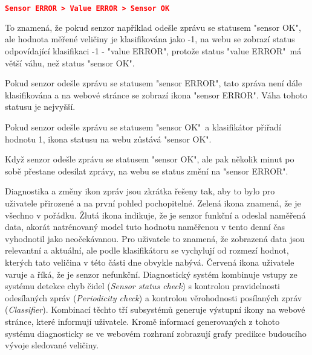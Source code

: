 \begin{lstlisting}[language=json]
	   Sensor ERROR > Value ERROR > Sensor OK
\end{lstlisting}

To znamená, že pokud senzor například odešle zprávu se statusem "sensor OK", ale hodnota měřené veličiny je klasifikována jako -1, na webu se zobrazí status odpovídající klasifikaci -1 - "value ERROR", protože status "value ERROR"\ má větší váhu, než status "sensor OK". \par
Pokud senzor odešle zprávu se statusem "sensor ERROR", tato zpráva není dále klasifikována a na webové stránce se zobrazí ikona "sensor ERROR". Váha tohoto statusu je nejvyšší. \par
Pokud senzor odešle zprávu se statusem "sensor OK"\ a klasifikátor přiřadí hodnotu 1, ikona statusu na webu zůstává "sensor OK". \par
Když senzor odešle zprávu se statusem "sensor OK", ale pak několik minut po sobě přestane odesílat zprávy, na webu se status změní na "sensor ERROR". \par
Diagnostika a změny ikon zpráv jsou zkrátka řešeny tak, aby to bylo pro uživatele přirozené a na první pohled pochopitelné. Zelená ikona znamená, že je všechno v pořádku. Žlutá ikona indikuje, že je senzor funkční a odeslal naměřená data, akorát natrénovaný model tuto hodnotu naměřenou v tento denní čas vyhodnotil jako neočekávanou. Pro uživatele to znamená, že zobrazená data jsou relevantní a aktuální, ale podle klasifikátoru se vychylují od rozmezí hodnot, kterých tato veličina v této části dne obvykle nabývá. Červená ikona uživatele varuje a říká, že je senzor nefunkční. Diagnostický systém kombinuje vstupy ze systému detekce chyb čidel (\textit{Sensor status check}) s kontrolou  pravidelnosti odesílaných zpráv (\textit{Periodicity check}) a kontrolou věrohodnosti posílaných zpráv (\textit{Classifier}). Kombinací těchto tří subsystémů generuje výstupní ikony na webové stránce, které informují uživatele. Kromě informací generovaných z tohoto systému diagnosticky se ve webovém rozhraní zobrazují grafy predikce budoucího vývoje sledované veličiny. 

